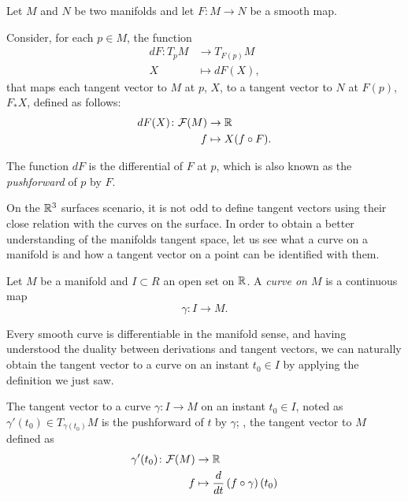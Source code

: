 \begin{definition}
	Let $M$ and $N$ be two manifolds and let $F \colon M \to N$ be a smooth map.
	
	Consider, for each $p \in M$, the function
	\begin{align*}
		dF \colon T_p M &\to T_{F(p)} M \\
		X &\mapsto dF(X),
	\end{align*}
	that maps each tangent vector to $M$ at $p$, $X$, to a tangent vector to $N$ at $F(p)$, $F_*X$, defined as follows:
	\begin{align*}
		dF(X) \colon \mathcal{F}(M) &\to \mathbb{R} \\
		f &\mapsto X(f \circ F).					
	\end{align*}

	The function $dF$ is the differential of $F$ at $p$, which is also known as the \emph{pushforward} of $p$ by $F$.
		   																	
\end{definition}

On the $\mathbb{R}^3$ surfaces scenario, it is not odd to define tangent vectors using their close relation with the curves on the surface. In order to obtain a better understanding of the manifolds tangent space, let us see what a curve on a manifold is and how a tangent vector on a point can be identified with them.

\begin{definition}
	Let $M$ be a manifold and $I \subset R$ an open set on $\mathbb{R}$. A \emph{curve on $M$} is a continuous map
	\[
		\gamma \colon I \to M.
	\]
\end{definition}

Every smooth curve is differentiable in the manifold sense, and having understood the duality between derivations and tangent vectors, we can naturally obtain the tangent vector to a curve on an instant $t_0\in I$ by applying the definition we just saw.

\begin{proposition}
	\label{pro:tangcurve}
	The tangent vector to a curve $\gamma \colon I \to M$ on an instant $t_0 \in I$, noted as $\gamma'(t_0) \in T_{\gamma(t_0)} M$ is the pushforward of $t$ by $\gamma$; \ie, the tangent vector to $M$ defined as
	\begin{align*}
		\gamma'(t_0) \colon \mathcal{F}(M) &\to \mathbb{R} \\
		f &\mapsto \frac{d}{dt} \left( f \circ \gamma \right) (t_0)
	\end{align*}
\end{proposition}

